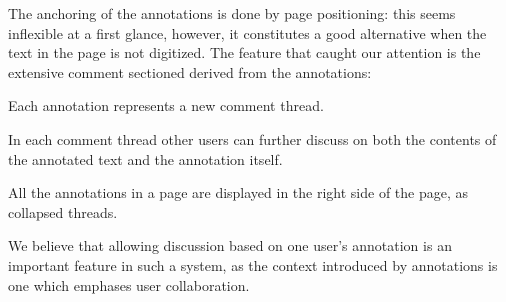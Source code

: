 The anchoring of the annotations is done by page positioning: this seems inflexible at a
first glance, however, it constitutes a good alternative when the text in the page is not
digitized.  The feature that caught our attention is the extensive comment sectioned
derived from the annotations:
\begin{compactitem}
\item Each annotation represents a new comment thread.
\item In each comment thread other users can further discuss on both the contents of the
  annotated text and the annotation itself.
\item All the annotations in a page are displayed in the right side of the page, as
  collapsed threads.
\end{compactitem}
We believe that allowing discussion based on one user's annotation is an important feature
in such a system, as the context introduced by annotations is one which emphases user
collaboration.



